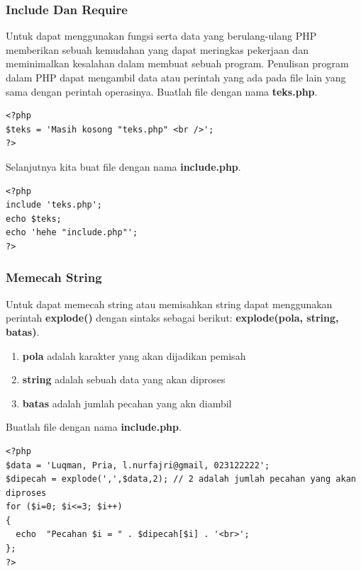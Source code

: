 \subsubsection{Include Dan Require}
Untuk dapat menggunakan fungsi serta data yang berulang-ulang PHP memberikan sebuah kemudahan yang dapat meringkas pekerjaan dan meminimalkan kesalahan dalam membuat sebuah program. Penulisan program dalam PHP dapat mengambil data atau perintah yang ada pada file lain yang sama dengan perintah operasinya. Buatlah file dengan nama \textbf{teks.php}.
\begin{lstlisting}
<?php
$teks = 'Masih kosong "teks.php" <br />';
?> 
\end{lstlisting}
Selanjutnya kita buat file dengan nama \textbf{include.php}.
\begin{lstlisting}
<?php
include 'teks.php';
echo $teks;
echo 'hehe "include.php"';
?>
\end{lstlisting}

\subsubsection{Memecah String}
Untuk dapat memecah string atau memisahkan string dapat menggunakan perintah \textbf{explode()} dengan sintaks sebagai berikut: \textbf{explode(pola, string, batas)}. 
\begin{enumerate}
\item \textbf{pola} adalah karakter yang akan dijadikan pemisah
\item \textbf{string} adalah sebuah data yang akan diproses
\item \textbf{batas} adalah jumlah pecahan yang akn diambil
\end{enumerate}
Buatlah file dengan nama \textbf{include.php}.
\begin{lstlisting}
<?php
$data = 'Luqman, Pria, l.nurfajri@gmail, 023122222';
$dipecah = explode(',',$data,2); // 2 adalah jumlah pecahan yang akan diproses
for ($i=0; $i<=3; $i++)
{
  echo  "Pecahan $i = " . $dipecah[$i] . '<br>';
};
?>
\end{lstlisting}

